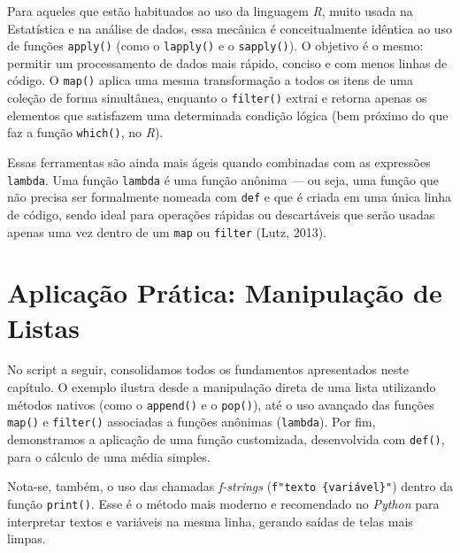 \documentclass[
  brazilian,
  letterpaper,
  DIV=11,
  numbers=noendperiod]{scrreprt}
\begin{document}
Para aqueles que estão habituados ao uso da linguagem \emph{R}, muito
usada na Estatística e na análise de dados, essa mecânica é
conceitualmente idêntica ao uso de funções \texttt{apply()} (como o
\texttt{lapply()} e o \texttt{sapply()}). O objetivo é o mesmo: permitir
um processamento de dados mais rápido, conciso e com menos linhas de
código. O \texttt{map()} aplica uma mesma transformação a todos os itens
de uma coleção de forma simultânea, enquanto o \texttt{filter()} extrai
e retorna apenas os elementos que satisfazem uma determinada condição
lógica (bem próximo do que faz a função \texttt{which()}, no \emph{R}).

Essas ferramentas são ainda mais ágeis quando combinadas com as
expressões \texttt{lambda}. Uma função \texttt{lambda} é uma função
anônima --- ou seja, uma função que não precisa ser formalmente nomeada
com \texttt{def} e que é criada em uma única linha de código, sendo
ideal para operações rápidas ou descartáveis que serão usadas apenas uma
vez dentro de um \texttt{map} ou \texttt{filter} (Lutz, 2013).

\section{Aplicação Prática: Manipulação de
Listas}\label{aplicauxe7uxe3o-pruxe1tica-manipulauxe7uxe3o-de-listas}

No script a seguir, consolidamos todos os fundamentos apresentados neste
capítulo. O exemplo ilustra desde a manipulação direta de uma lista
utilizando métodos nativos (como o \texttt{append()} e o
\texttt{pop()}), até o uso avançado das funções \texttt{map()} e
\texttt{filter()} associadas a funções anônimas (\texttt{lambda}). Por
fim, demonstramos a aplicação de uma função customizada, desenvolvida
com \texttt{def()}, para o cálculo de uma média simples.

Nota-se, também, o uso das chamadas \emph{f-strings}
(\texttt{f"texto\ \{variável\}"}) dentro da função \texttt{print()}.
Esse é o método mais moderno e recomendado no \emph{Python} para
interpretar textos e variáveis na mesma linha, gerando saídas de telas
mais limpas.
\end{document}
